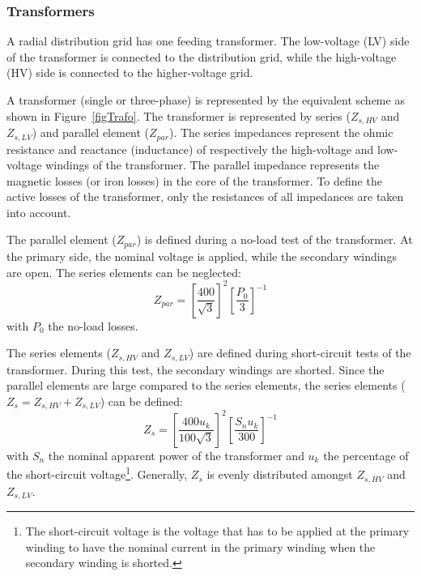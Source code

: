 \subsubsection{Transformers}

A radial distribution grid has one feeding transformer. The low-voltage (LV) side of the transformer is connected to the distribution grid, while the high-voltage (HV) side is connected to the higher-voltage grid.

A transformer (single or three-phase) is represented by the equivalent scheme as shown in Figure~\ref{figTrafo}. The transformer is represented by series ($Z_{s,HV}$ and $Z_{s,LV}$) and parallel element ($Z_{par}$). The series impedances represent the ohmic resistance and reactance (inductance) of respectively the high-voltage and low-voltage windings of the transformer. The parallel impedance represents the magnetic losses (or iron losses) in the core of the transformer. To define the active losses of the transformer, only the resistances of all impedances are taken into account.


The parallel element ($Z_{par}$) is defined during a no-load test of the transformer. At the primary side, the nominal voltage is applied, while the secondary windings are open. The series elements can be neglected:
\begin{equation}
Z_{par} = \left[ \frac{400}{\sqrt{3}} \right]^2 \left[ \frac{P_0}{3} \right]^{-1}
\label{3Ploss}
\end{equation}
with $P_0$ the no-load losses.

The series elements ($Z_{s,HV}$ and $Z_{s,LV}$) are defined during short-circuit tests of the transformer. During this test, the secondary windings are shorted. Since the parallel elements are large compared to the series elements, the series elements ($Z_s = Z_{s,HV} + Z_{s,LV}$)  can be defined:
\begin{equation}
Z_s = \left[ \frac{400 u_k}{100 \sqrt{3}} \right]^2 \left[ \frac{S_n u_k}{300} \right]^{-1}
\label{3Ploss}
\end{equation}
with $S_n$ the nominal apparent power of the transformer and $u_k$ the percentage of the short-circuit voltage\footnote{The short-circuit voltage is the voltage that has to be applied at the primary winding to have the nominal current in the primary winding when the secondary winding is shorted.}. Generally, $Z_s$ is evenly distributed amongst $Z_{s,HV}$ and $Z_{s,LV}$.

